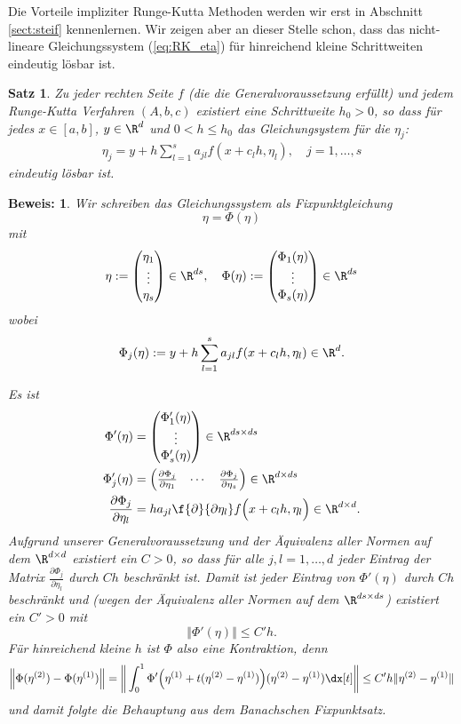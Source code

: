 \documentclass[
]{mycourse}
\theoremstyle{mythm}
\newtheorem{theorem}{Satz}[chapter]
\theoremstyle{break}
\newtheorem*{beweis}{Beweis:}
\newcommand{\norm}[1]{\left\Vert#1\right\Vert}		%
\newcommand{\labeq}[1]{\label{eq:#1}}			%
\newcommand{\req}[1]{(\ref{eq:#1})}
\begin{document}
Die Vorteile impliziter Runge-Kutta Methoden werden wir erst in Abschnitt \ref{sect:steif} kennenlernen. 
Wir zeigen aber an dieser Stelle schon, dass das nicht-lineare Gleichungssystem \req{RK_eta} für hinreichend kleine Schrittweiten eindeutig lösbar ist.

\begin{theorem}
Zu jeder rechten Seite $f$ (die die Generalvoraussetzung erfüllt)
und jedem Runge-Kutta Verfahren $(A,b,c)$ existiert eine Schrittweite $h_0>0$,
so dass für jedes $x\in [a,b]$, $y\in \R^d$ und $0<h\leq h_0$ das 
Gleichungsystem für die $\eta_j$:
\begin{align*}%
\eta_j = y + h \sum_{l=1}^s a_{jl} f(x + c_l h,\eta_l), \quad j=1,\ldots,s
\end{align*}
eindeutig lösbar ist.
\end{theorem}
\begin{beweis}
Wir schreiben das Gleichungssystem als Fixpunktgleichung 
\[
\eta=\Phi(\eta)
\]
mit 
\[
\eta:=\begin{pmatrix} \eta_1\\ \vdots \\ \eta_s \end{pmatrix}\in \R^{ds}, \quad
\Phi(\eta):=\begin{pmatrix} \Phi_1(\eta)\\ \vdots \\ \Phi_s(\eta) \end{pmatrix}\in \R^{ds}
\]
wobei
\[
\Phi_j(\eta):=y + h \sum_{l=1}^s a_{jl} f(x + c_l h,\eta_l)\in \R^d.
\]

Es ist
\begin{align*}
\Phi'(\eta)&=\begin{pmatrix} \Phi_1'(\eta)\\ \vdots \\ \Phi_s'(\eta) \end{pmatrix}\in \R^{ds\times ds}\\
\Phi_j'(\eta)&= \begin{pmatrix} \frac{\partial \Phi_j}{\partial \eta_1} & \cdots & \frac{\partial \Phi_j}{\partial \eta_s} \end{pmatrix}\in \R^{d\times ds}\\
\frac{\partial \Phi_j}{\partial \eta_l} &=  h a_{jl} \f{\partial}{\partial \eta_l}f\Big(x + c_l h,\eta_l\Big) \in \R^{d\times d}.
\end{align*}
Aufgrund unserer Generalvoraussetzung und der Äquivalenz aller Normen auf dem $\R^{d\times d}$ existiert ein $C>0$, so
dass für alle $j,l=1,\ldots,d$ jeder Eintrag der Matrix $\frac{\partial \Phi_j}{\partial \eta_l}$ durch $Ch$ beschränkt ist.
Damit ist jeder Eintrag von $\Phi'(\eta)$ durch $Ch$ beschränkt und (wegen der Äquivalenz aller Normen auf dem $\R^{ds\times ds}$) existiert ein $C'>0$ mit
\[
\norm{\Phi'(\eta)}\leq C'h.
\]
Für hinreichend kleine $h$ ist $\Phi$ also eine Kontraktion, denn
\[
	\Big\| \Phi(\eta^{(2)}) - \Phi(\eta^{(1)}) \Big\|
	= \bigg\| \int_0^1 \Phi'\Big(\eta^{(1)} + t (\eta^{(2)}-\eta^{(1)})\Big)(\eta^{(2)}-\eta^{(1)}) \dx[t] \bigg\|
	\le C'h \| \eta^{(2)} - \eta^{(1)} \|
\]
und damit folgte die Behauptung aus dem Banachschen Fixpunktsatz.
\end{beweis}
\end{document}
